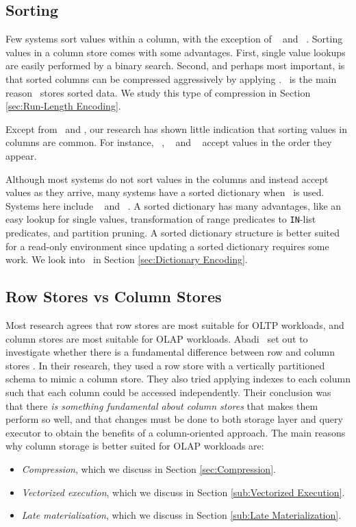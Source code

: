 \subsection{Sorting}
\label{sub:Sorting}
Few systems sort values within a column, with the exception of \cstore~\cite{Stonebraker2005-qz} and \vertica~\cite{Lamb2012-kg}. Sorting values in a column store comes with some advantages. First, single value lookups are easily performed by a binary search. Second, and perhaps most important, is that sorted columns can be compressed aggressively by applying \rle. \rle~is the main reason \cstore~stores sorted data. We study this type of compression in Section \ref{sec:Run-Length Encoding}.

Except from \cstore~and \vertica, our research has shown little indication that sorting values in columns are common. For instance, \mssql~\cite{Larson2013-mc}, \blink~\cite{Raman2013-em} and \oracle~\cite{Lahiri2015-mz} accept values in the order they appear.

Although most systems do not sort values in the columns and instead accept values as they arrive, many systems have a sorted dictionary when \de~is used. Systems here include \blink~\cite{Johnson2008-cp} and \saph~\cite{Farber2012-vh}. A sorted dictionary has many advantages, like an easy lookup for single values, transformation of range predicates to \texttt{IN}-list predicates, and partition pruning. A sorted dictionary structure is better suited for a read-only environment since updating a sorted dictionary requires some work. We look into \de~in Section \ref{sec:Dictionary Encoding}. 

\subsection{Row Stores vs Column Stores}
\label{sub:Row Stores vs Column Stores}
Most research agrees that row stores are most suitable for OLTP workloads, and column stores are most suitable for OLAP workloads. Abadi \ea~set out to investigate whether there is a fundamental difference between row and column stores \cite{Abadi2008-dd}. In their research, they used a row store with a vertically partitioned schema to mimic a column store. They also tried applying indexes to each column such that each column could be accessed independently. Their conclusion was that there \textit{is something fundamental about column stores} that makes them perform so well, and that changes must be done to both storage layer and query executor to obtain the benefits of a column-oriented approach. The main reasons why column storage is better suited for OLAP workloads are:
\begin{itemize}
  \item \textit{Compression}, which we discuss in Section \ref{sec:Compression}.
  \item \textit{Vectorized execution}, which we discuss in Section \ref{sub:Vectorized Execution}.
  \item \textit{Late materialization}, which we discuss in Section \ref{sub:Late Materialization}. 
\end{itemize}

